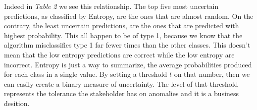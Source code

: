 \documentclass[11pt,twoside]{article}
\numberwithin{Theorem}{section}
\numberwithin{Definition}{section}
\numberwithin{Lemma}{section}
\numberwithin{Algorithm}{section}
\numberwithin{equation}{section}
\begin{document}
\begin{table}[!ht]
\centering
{}
\label{tab:entropy}
\caption{Top five most and least anomalous datapoints by Entropy}
\end{table}

Indeed in \textit{Table 2} we see this relationship. The top five most uncertain predictions, as classified by Entropy, are the ones that are almost random. On the contrary, the least uncertain predictions, are the ones that are predicted with highest probability. This all happen to be of \textsf{type 1}, because we know that the algorithm misclassifies \textsf{type 1} far fewer times than the other classes. This doesn't mean that the low entropy predictions are correct while the low entropy are incorrect. Entropy is just a way to summarize, the average probabilities produced for each class in a single value. By setting a threshold $t$ on that number, then we can easily create a binary measure of uncertainty. The level of that threshold represents the tolerance the stakeholder has on anomalies and it is a business desition.
\end{document}
